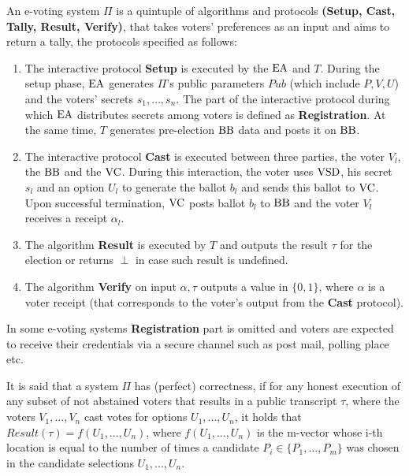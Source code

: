 An e-voting system $\Pi$ is a quintuple of algorithms and protocols  \textbf{(Setup, Cast, Tally, Result, Verify)}, that takes  voters' preferences as an input and aims to return a tally, the protocols specified as follows:
\begin{enumerate}
\item The interactive protocol \textbf{Setup} is executed by the $\operatorname{EA}$ and $T$. During the setup phase, $\operatorname{EA}$ generates $\Pi$'s public parameters $Pub$ (which include $P, V, U$) and the voters' secrets $s_1, \dots , s_n$. The part of the interactive protocol during which $\operatorname{EA}$ distributes secrets among voters is defined as \textbf{Registration}. At the same time, $T$ generates pre-election $\operatorname{BB}$ data and posts it on $\operatorname{BB}$.
\item The interactive protocol \textbf{Cast} is executed between three parties, the voter $V_l$, the $\operatorname{BB}$ and the $\operatorname{VC}$. During this interaction, the voter uses $\operatorname{VSD}$, his secret $s_l$ and an option $U_l$ to generate the ballot $b_l$ and sends this ballot to $\operatorname{VC}$. Upon successful termination, $\operatorname{VC}$ posts ballot $b_l$ to $\operatorname{BB}$ and the voter $V_l$ receives a receipt $\alpha_l$.
\item The algorithm \textbf{Result} is executed by $T$ and outputs the result $\tau$ for the election or returns $\perp$ in case such result is undefined.
\item  The algorithm \textbf{Verify} on input $\alpha,\tau$ outputs a value in $\{0,1\}$, where  $\alpha$ is a voter receipt (that corresponds to the voter's output from the \textbf{Cast} protocol).
\end{enumerate}
In some e-voting systems \textbf{Registration} part is omitted and voters are expected to receive their credentials via a secure channel such as post mail, polling place etc.\\

\begin{definition}
It is said that a system $\Pi$ has (perfect) correctness, if for any honest execution of any subset of not abstained voters that results in a public transcript $\tau$, where the voters $V_1, . . . , V_n$ cast votes for options $U_1, . . . , U_n$, it holds that $Result(\tau) = f(U_1,...,U_n)$, where $f(U_1,...,U_n)$ is the m-vector whose i-th location is equal to the number of times a candidate $P_i \in \{P_1,\dots, P_m\}$ was chosen in the candidate selections $U_1, . . . , U_n$.
\end{definition}
